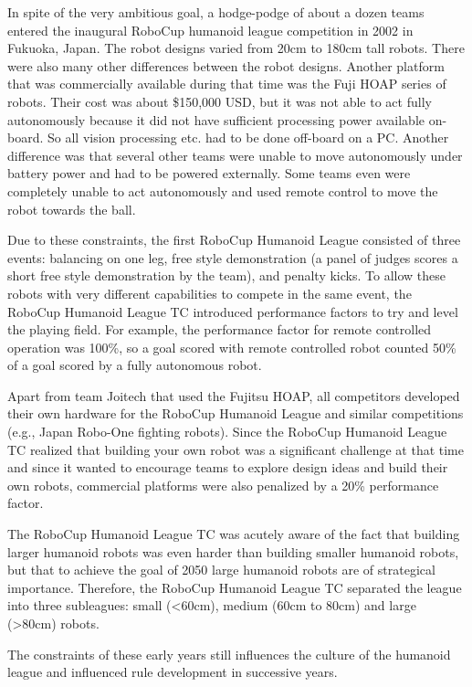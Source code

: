 \documentclass{llncs}
\begin{document}
In spite of the very ambitious goal, a hodge-podge of about a dozen
teams entered the inaugural RoboCup humanoid league competition in
2002 in Fukuoka, Japan. The robot designs varied from 20cm to 180cm
tall robots. There were also many other differences between the robot
designs. Another platform that was commercially available during that
time was the Fuji HOAP series of robots. Their cost was
about \$150,000 USD, but it was not able to act fully autonomously
because it did not have sufficient processing power available
on-board. So all vision processing etc. had to be done off-board on a
PC. Another difference was that several other teams were unable to
move autonomously under battery power and had to be powered
externally. Some teams even were completely unable to act autonomously
and used remote control to move the robot towards the ball.

Due to these constraints, the first RoboCup Humanoid League consisted
of three events: balancing on one leg, free style demonstration (a
panel of judges scores a short free style demonstration by the team),
and penalty kicks. To allow these robots with very different
capabilities to compete in the same event, the RoboCup Humanoid League
TC introduced performance factors to try and level the playing
field. For example, the performance factor for remote controlled
operation was 100\%, so a goal scored with remote controlled robot
counted 50\% of a goal scored by a fully autonomous robot.

Apart from team Joitech that used the Fujitsu HOAP, all competitors
developed their own hardware for the RoboCup Humanoid League and
similar competitions (e.g., Japan Robo-One fighting robots). Since the
RoboCup Humanoid League TC realized that building your own robot was a
significant challenge at that time and since it wanted to encourage
teams to explore design ideas and build their own robots, commercial
platforms were also penalized by a 20\% performance factor.

The RoboCup Humanoid League TC was acutely aware of the fact that
building larger humanoid robots was even harder than building smaller
humanoid robots, but that to achieve the goal of 2050 large humanoid
robots are of strategical importance. Therefore, the RoboCup Humanoid
League TC separated the league into three subleagues: small (<60cm),
medium (60cm to 80cm) and large (>80cm) robots.

The constraints of these early years still influences the culture of
the humanoid league and influenced rule development in successive
years.
\end{document}

